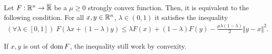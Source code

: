 \documentclass[12pt]{article}
\begin{document}
        \begin{theorem}\label{thm:jesen}
            Let $F: \mathbb R^n \rightarrow \overline {\mathbb R}$ be a $\mu \ge 0$ strongly convex function. 
            Then, it is equivalent to the following condition. 
            For all $x, y \in \mathbb R^n$, $\lambda \in (0, 1)$ it satisfies the inequality 
            \begin{align*}
                (\forall \lambda \in [0, 1])\; 
                F(\lambda x + (1 - \lambda)y) \le \lambda F(x) + (1 - \lambda)F(y) -\frac{\mu\lambda(1 - \lambda)}{2} \Vert y - x\Vert^2. 
            \end{align*}
        \end{theorem}
        \begin{remark}
            If $x, y$ is out of $\operatorname{dom} F$, the inequality still work by convexity. 
        \end{remark}
\end{document}
